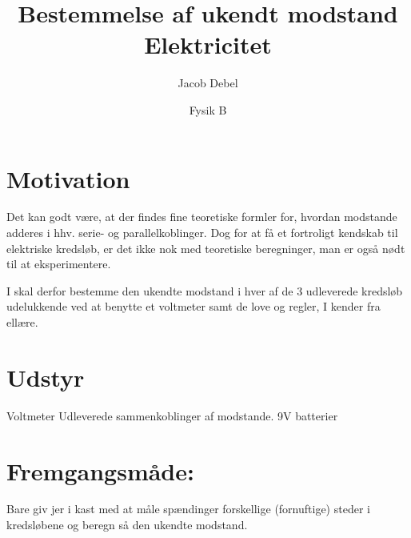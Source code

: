 \documentclass[a4paper, 12pt]{article}
\author{Jacob Debel}
\date{Fysik B}
\title{Bestemmelse af ukendt modstand\\\medskip
\large Elektricitet}
\begin{document}
\maketitle

\section*{Motivation}
\label{sec:org8a7df4d}
Det kan godt være, at der findes fine teoretiske formler for, hvordan modstande adderes i hhv. serie- og parallelkoblinger. Dog for at få et fortroligt kendskab til elektriske kredsløb, er det ikke nok med teoretiske beregninger, man er også nødt til at eksperimentere.

I skal derfor bestemme den ukendte modstand i hver af de 3 udleverede kredsløb udelukkende ved at benytte et voltmeter samt de love og regler, I kender fra ellære.
\section*{Udstyr}
\label{sec:org5a496d6}
Voltmeter
Udleverede sammenkoblinger af modstande.
9V batterier

\section*{Fremgangsmåde:}
\label{sec:org0fbec54}
Bare giv jer i kast med at måle spændinger forskellige (fornuftige) steder i kredsløbene og beregn så den ukendte modstand.
\end{document}
